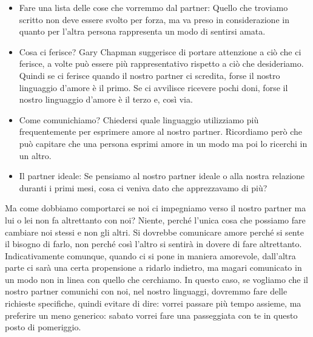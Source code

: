 \documentclass[12pt]{book} %
\begin{document}
\begin{itemize}
\item Fare una lista delle cose che vorremmo dal partner: Quello che troviamo scritto non deve essere svolto per forza,
ma va preso in considerazione in quanto per l'altra persona rappresenta un modo di sentirsi amata.
\item Cosa ci ferisce? Gary Chapman suggerisce di portare attenzione a ciò che ci ferisce, a volte può essere più
rappresentativo rispetto a ciò che desideriamo. Quindi se ci ferisce quando il nostro partner ci scredita, forse il
nostro linguaggio d'amore è il primo. Se ci avvilisce ricevere pochi doni, forse il nostro linguaggio d'amore è il
terzo e, così via.
\item Come comunichiamo? Chiedersi quale linguaggio utilizziamo più frequentemente per esprimere amore al nostro
partner. Ricordiamo però che può capitare che una persona esprimi amore in un modo ma poi lo ricerchi in un altro.
\item Il partner ideale: Se pensiamo al nostro partner ideale o alla nostra relazione duranti i primi mesi, cosa ci
veniva dato che apprezzavamo di più?
\end{itemize}

Ma come dobbiamo comportarci se noi ci impegniamo verso il nostro partner ma lui o lei non fa altrettanto con noi?
Niente, perché l'unica cosa che possiamo fare cambiare noi stessi e non gli altri. Si dovrebbe comunicare amore perché
si sente il bisogno di farlo, non perché così l'altro si sentirà in dovere di fare altrettanto.
Indicativamente comunque, quando ci si pone in maniera amorevole, dall'altra parte ci sarà una certa propensione a
ridarlo indietro, ma magari comunicato in un modo non in linea con quello che cerchiamo. In questo caso, se vogliamo
che il nostro partner comunichi con noi, nel nostro linguaggi, dovremmo fare delle richieste specifiche, quindi evitare
di dire: vorrei passare più tempo assieme, ma preferire un meno generico: sabato vorrei fare una passeggiata con te in
questo posto di pomeriggio.
\end{document}
